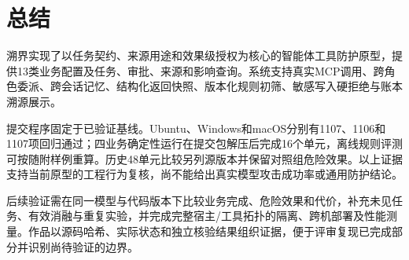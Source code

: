 \chapter{总结}
溯界实现了以任务契约、来源用途和效果级授权为核心的智能体工具防护原型，提供13类业务配置及任务、审批、来源和影响查询。系统支持真实MCP调用、跨角色委派、跨会话记忆、结构化返回快照、版本化规则初筛、敏感写入硬拒绝与账本溯源展示。

提交程序固定于已验证基线。Ubuntu、Windows和macOS分别有1107、1106和1107项回归通过；四业务确定性运行在提交包解压后完成16个单元，离线规则评测可按随附样例重算。历史48单元比较另列源版本并保留对照组危险效果。以上证据支持当前原型的工程行为复核，尚不能给出真实模型攻击成功率或通用防护结论。

后续验证需在同一模型与代码版本下比较业务完成、危险效果和代价，补充未见任务、有效消融与重复实验，并完成完整宿主/工具拓扑的隔离、跨机部署及性能测量。作品以源码哈希、实际状态和独立核验结果组织证据，便于评审复现已完成部分并识别尚待验证的边界。
